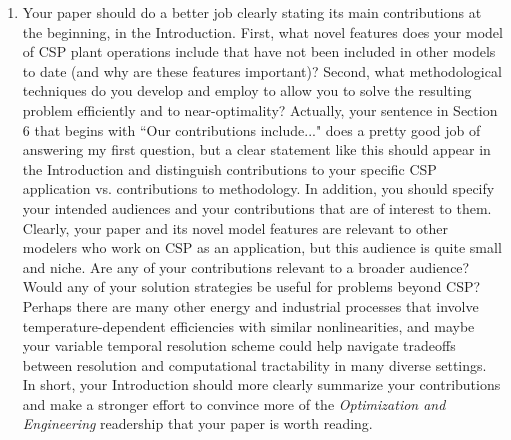 \documentclass[10pt]{article}
\begin{document}
\begin{enumerate}

\item Your paper should do a better job clearly stating its main contributions at
the beginning, in the Introduction. First, what novel features does your model
of CSP plant operations include that have not been included in other models to
date (and why are these features important)? Second, what methodological
techniques do you develop and employ to allow you to solve the resulting
problem efficiently and to near-optimality? Actually, your sentence in Section
6 that begins with ``Our contributions include..." does a pretty good job of
answering my first question, but a clear statement like this should appear in
the Introduction and distinguish contributions to your specific CSP application
vs. contributions to methodology. In addition, you should specify your intended
audiences and your contributions that are of interest to them. Clearly, your
paper and its novel model features are relevant to other modelers who work on
CSP as an application, but this audience is quite small and niche. Are any of
your contributions relevant to a broader audience? Would any of your solution
strategies be useful for problems beyond CSP? Perhaps there are many other
energy and industrial processes that involve temperature-dependent efficiencies
with similar nonlinearities, and maybe your variable temporal resolution scheme
could help navigate tradeoffs between resolution and computational tractability
in many diverse settings. In short, your Introduction should more clearly
summarize your contributions and make a stronger effort to convince more of the
{\it Optimization and Engineering} readership that your paper is worth reading.


\end{enumerate}
\end{document}
